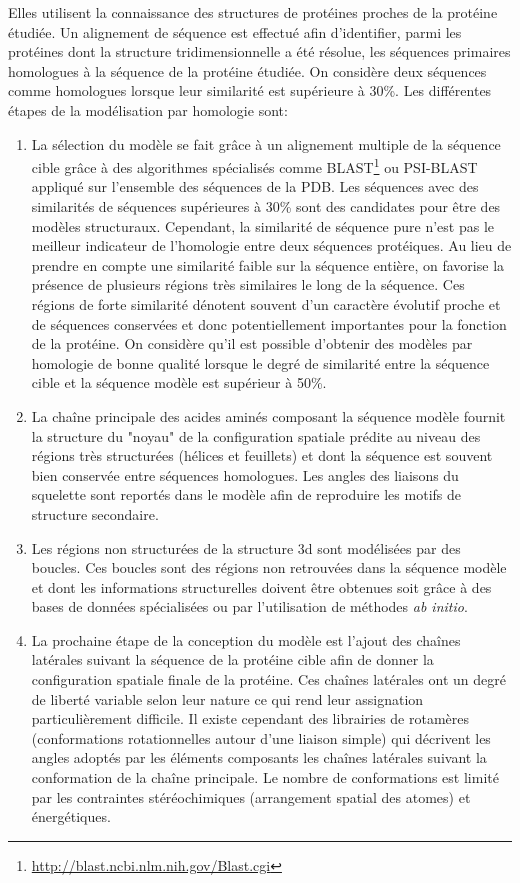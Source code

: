 Elles utilisent la connaissance des structures de protéines proches de la protéine étudiée. Un alignement de séquence est effectué afin d'identifier, parmi les protéines dont la structure tridimensionnelle a été résolue, les séquences primaires homologues à la séquence de la protéine étudiée. On considère deux séquences comme homologues lorsque leur similarité est supérieure à 30\%. Les différentes étapes de la modélisation par homologie sont:
\begin{enumerate}
	\item La sélection du modèle se fait grâce à un alignement multiple de la séquence cible grâce à des algorithmes spécialisés comme BLAST\footnote{\url{http://blast.ncbi.nlm.nih.gov/Blast.cgi}} ou PSI-BLAST appliqué sur l'ensemble des séquences de la PDB. Les séquences avec des similarités de séquences supérieures à 30\% sont des candidates pour être des modèles structuraux. Cependant, la similarité de séquence pure n'est pas le meilleur indicateur de l'homologie entre deux séquences protéiques. Au lieu de prendre en compte une similarité faible sur la séquence entière, on favorise la présence de plusieurs régions très similaires le long de la séquence. Ces régions de forte similarité dénotent souvent d'un caractère évolutif proche et de séquences conservées et donc potentiellement importantes pour la fonction de la protéine. On considère qu'il est possible d'obtenir des modèles par homologie de bonne qualité lorsque le degré de similarité entre la séquence cible et la séquence modèle est supérieur à 50\%.
	\item La chaîne principale des acides aminés composant la séquence modèle fournit la structure du "noyau" de la configuration spatiale prédite au niveau des régions très structurées (hélices et feuillets) et dont la séquence est souvent bien conservée entre séquences homologues. Les angles des liaisons du squelette sont reportés dans le modèle afin de reproduire les motifs de structure secondaire.
	\item Les régions non structurées de la structure 3d sont modélisées par des boucles. Ces boucles sont des régions non retrouvées dans la séquence modèle et dont les informations structurelles doivent être obtenues soit grâce à des bases de données spécialisées ou par l'utilisation de méthodes \textit{ab initio}.
	\item La prochaine étape de la conception du modèle est l'ajout des chaînes latérales suivant la séquence de la protéine cible afin de donner la configuration spatiale finale de la protéine. Ces chaînes latérales ont un degré de liberté variable selon leur nature ce qui rend leur assignation particulièrement difficile. Il existe cependant des librairies de rotamères (conformations rotationnelles autour d'une liaison simple) qui décrivent les angles adoptés par les éléments composants les chaînes latérales suivant la conformation de la chaîne principale. Le nombre de conformations est limité par les contraintes stéréochimiques (arrangement spatial des atomes) et énergétiques.

\end{enumerate}
